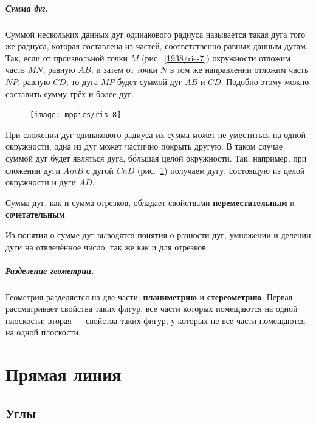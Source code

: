 \documentclass[oneside]{book}
\begin{document}
\paragraph{Сумма дуг.}\label{1938/11}
Суммой нескольких данных дуг одинакового радиуса называется такая дуга того же радиуса, которая составлена из частей, соответственно равных данным дугам.
Так, если от произвольной точки $M$ (рис.~\ref{1938/ris-7}) окружности отложим часть $MN$, равную $AB$, и затем от точки $N$ в том же направлении отложим часть $NP$, равную $CD$, то дуга $MP$ будет суммой дуг $AB$ и $CD$.
Подобно этому можно составить сумму трёх и более дуг.

\begin{figure}[h!]
\centering
\texttt{[image: mppics/ris-8]}
\caption{}\label{1938/ris-8}
\end{figure}

При сложении дуг одинакового радиуса их сумма может не уместиться на одной окружности, одна из дуг может частично покрыть другую.
В таком случае суммой дуг будет являться дуга, б\'{о}льшая целой окружности.
Так, например, при сложении дуги $AmB$ с дугой $CnD$ (рис.~\ref{1938/ris-8}) получаем дугу, состоящую из целой окружности и дуги $AD$.


Сумма дуг, как и сумма отрезков, обладает свойствами \textbf{переместительным} и \textbf{сочетательным}.

Из понятия о сумме дуг выводятся понятия о разности дуг, умножении и делении дуги на отвлечённое число, так же как и для отрезков.


\paragraph{Разделение геометрии.}\label{1938/12}
Геометрия разделяется на две части:
\textbf{планиметрию} и \textbf{стереометрию}.
Первая рассматривает свойства таких фигур, все части которых помещаются на одной плоскости;
вторая — свойства таких фигур, у которых не все части помещаются на одной плоскости.




\chapter{Прямая линия}


\section{Углы} 
\end{document}
